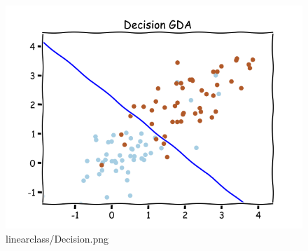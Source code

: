 \begin{answer}
  \begin{figure}[htpb]
    \centering
    \includegraphics[width=0.8\linewidth]{linearclass/decision.gda.png}
    \caption{linearclass/Decision.png}%
    \label{fig:linearclass/decision.png}
  \end{figure}
\end{answer}
